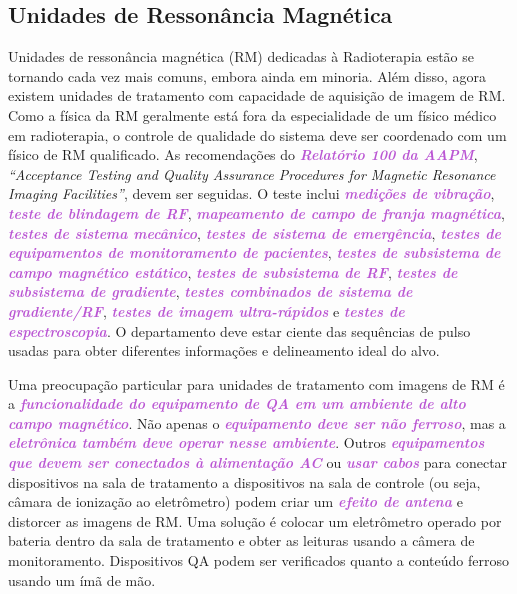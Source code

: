 \documentclass[11pt,a4paper]{article}
\begin{document}
\subsection*{Unidades de Ressonância Magnética}

	Unidades de ressonância magnética (RM) dedicadas à Radioterapia estão se tornando cada vez mais comuns, embora ainda em minoria. Além disso, agora existem unidades de tratamento com capacidade de aquisição de imagem de RM. Como a física da RM geralmente está fora da especialidade de um físico médico em radioterapia, o controle de qualidade do sistema deve ser coordenado com um físico de RM qualificado. As recomendações do \textcolor{MediumOrchid}{\textbf{\textit{Relatório 100 da AAPM}}},  \textit{``Acceptance Testing and Quality Assurance Procedures for Magnetic Resonance Imaging Facilities''}, devem ser seguidas. O teste inclui \textcolor{MediumOrchid}{\textbf{\textit{medições de vibração}}}, \textcolor{MediumOrchid}{\textbf{\textit{teste de blindagem de RF}}}, \textcolor{MediumOrchid}{\textbf{\textit{mapeamento de campo de franja magnética}}}, \textcolor{MediumOrchid}{\textbf{\textit{testes de sistema mecânico}}}, \textcolor{MediumOrchid}{\textbf{\textit{testes de sistema de emergência}}}, \textcolor{MediumOrchid}{\textbf{\textit{testes de equipamentos de monitoramento de pacientes}}}, \textcolor{MediumOrchid}{\textbf{\textit{testes de subsistema de campo magnético estático}}}, \textcolor{MediumOrchid}{\textbf{\textit{testes de subsistema de RF}}}, \textcolor{MediumOrchid}{\textbf{\textit{testes de subsistema de gradiente}}}, \textcolor{MediumOrchid}{\textbf{\textit{testes combinados de sistema de gradiente/RF}}}, \textcolor{MediumOrchid}{\textbf{\textit{testes de imagem ultra-rápidos}}} e \textcolor{MediumOrchid}{\textbf{\textit{testes de espectroscopia}}}. O departamento deve estar ciente das sequências de pulso usadas para obter diferentes informações e delineamento ideal do alvo.

	Uma preocupação particular para unidades de tratamento com imagens de RM é a \textcolor{MediumOrchid}{\textbf{\textit{funcionalidade do equipamento de QA em um ambiente de alto campo magnético}}}. Não apenas o \textcolor{MediumOrchid}{\textbf{\textit{equipamento deve ser não ferroso}}}, mas a \textcolor{MediumOrchid}{\textbf{\textit{eletrônica também deve operar nesse ambiente}}}. Outros \textcolor{MediumOrchid}{\textbf{\textit{equipamentos que devem ser conectados à alimentação AC}}} ou \textcolor{MediumOrchid}{\textbf{\textit{usar cabos}}} para conectar dispositivos na sala de tratamento a dispositivos na sala de controle (ou seja, câmara de ionização ao eletrômetro) podem criar um \textcolor{MediumOrchid}{\textbf{\textit{efeito de antena}}} e distorcer as imagens de RM. Uma solução é colocar um eletrômetro operado por bateria dentro da sala de tratamento e obter as leituras usando a câmera de monitoramento. Dispositivos QA podem ser verificados quanto a conteúdo ferroso usando um ímã de mão.
\end{document}

